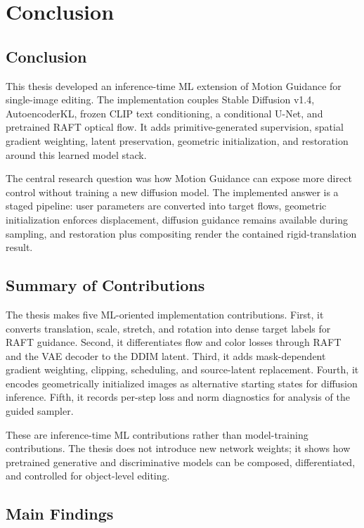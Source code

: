 \setlength{\footskip}{8mm}

\chapter{Conclusion}
\label{ch:conclusion}

\section{Conclusion}

This thesis developed an inference-time ML extension of Motion Guidance for single-image editing. The implementation couples Stable Diffusion v1.4, AutoencoderKL, frozen CLIP text conditioning, a conditional U-Net, and pretrained RAFT optical flow. It adds primitive-generated supervision, spatial gradient weighting, latent preservation, geometric initialization, and restoration around this learned model stack.

The central research question was how Motion Guidance can expose more direct control without training a new diffusion model. The implemented answer is a staged pipeline: user parameters are converted into target flows, geometric initialization enforces displacement, diffusion guidance remains available during sampling, and restoration plus compositing render the contained rigid-translation result.

\section{Summary of Contributions}

The thesis makes five ML-oriented implementation contributions. First, it converts translation, scale, stretch, and rotation into dense target labels for RAFT guidance. Second, it differentiates flow and color losses through RAFT and the VAE decoder to the DDIM latent. Third, it adds mask-dependent gradient weighting, clipping, scheduling, and source-latent replacement. Fourth, it encodes geometrically initialized images as alternative starting states for diffusion inference. Fifth, it records per-step loss and norm diagnostics for analysis of the guided sampler.

These are inference-time ML contributions rather than model-training contributions. The thesis does not introduce new network weights; it shows how pretrained generative and discriminative models can be composed, differentiated, and controlled for object-level editing.

\section{Main Findings}

